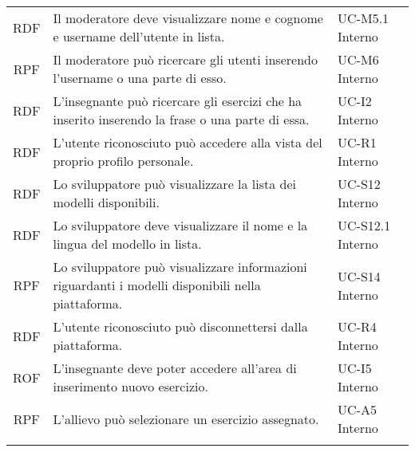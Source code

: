 \begin{tabularx}{\textwidth}{| c | p{10cm} | X |}
		RDF & Il moderatore deve visualizzare nome e cognome e username dell'utente in lista. & UC-M5.1 \newline Interno\\
		RPF & Il moderatore può ricercare gli utenti inserendo l'username o una parte di esso. & UC-M6 \newline Interno\\
		RDF & L'insegnante può ricercare gli esercizi che ha inserito inserendo la frase o una parte di essa. & UC-I2 \newline Interno\\
		RDF & L'utente riconosciuto può accedere alla vista del proprio profilo personale. & UC-R1 \newline Interno\\
		RDF & Lo sviluppatore può visualizzare la lista dei modelli disponibili. & UC-S12 \newline Interno\\
		RDF & Lo sviluppatore deve visualizzare il nome e la lingua del modello in lista. & UC-S12.1 \newline Interno\\
		RPF & Lo sviluppatore può visualizzare informazioni riguardanti i modelli disponibili nella piattaforma. & UC-S14 \newline Interno\\
		RDF & L'utente riconosciuto può disconnettersi dalla piattaforma. & UC-R4 \newline Interno\\
		ROF & L'insegnante deve poter accedere all'area di inserimento nuovo esercizio. & UC-I5 \newline Interno\\
		RPF & L'allievo può selezionare un esercizio assegnato. & UC-A5 \newline Interno\\
		\hline
		\caption{Tabella dei requisiti funzionali}
\end{tabularx}

